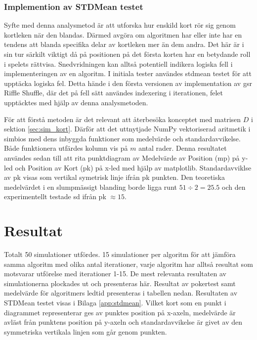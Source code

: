 \documentclass[swedish,a4paper]{article}
\begin{document}
\subsubsection{Implemention av STDMean testet}
Syfte med denna analysmetod är att utforska hur enskild kort rör sig genom
kortleken när den blandas. Därmed avgöra om algoritmen har eller inte har en
tendens att blanda specifika delar av kortleken mer än dem andra. Det här är i sin
tur särkilt viktigt då på positionen på det första korten har en betydande roll i spelets rättvisa. Snedvridningen kan alltså
potentiell indikera logiska fell i implementeringen av en algoritm. I initiala
tester användes \gls{stdmean} testet för att upptäcka logiska fel. Detta hände i
den första versionen av implementation av \gls{gsr} Riffle Shuffle, där det på
fell sätt användes indexering i iterationen, felet upptäcktes med hjälp av denna
analysmetoden. 

För att förstå metoden är det relevant att återbesöka konceptet med matrisen $D$
i sektion \ref{sec:sim_kort}. Därför att det uttnytjade NumPy vektoriserad
aritmetik i simbios med dens inbyggda funktioner som medelvärde och
standardavvikelse. Både funktionera utfärdes kolumn vis på $m$ antal rader.
Denna resultatet användes sedan till att rita punktdiagram av Medelvärde av
Position (\gls{mp}) på y-led  och Position av Kort (\gls{pk}) på x-led med hjälp
av matplotlib. Standardavviklse av \gls{pk} visas som vertikal symetrisk linje
ifrån \gls{pk} punkten. Den teoretiska medelvärdet i en slumpmässigt blanding
borde ligga runt $51 \div 2 = 25.5$ och den experimentellt testade \gls{sd}
ifrån \gls{pk} $\approx 15$.

\section{Resultat}


Totalt 50 simulationer utfördes. 15 simulationer per algoritm för att jämföra
samma algoritm med olika antal iterationer, varje algoritm har alltså resultat
som motsvarar utförelse med iterationer 1-15. De mest relevanta resultaten av
simulationerna plockades ut och presenteras här. Resultat av pokertest samt
medelvärde för algoritmers ledtid presenteras i tabellen nedan. Resultaten
av STDMean testet visas i Bilaga \ref{app:stdmean}. Vilket kort som en punkt i
diagrammet representerar ges av punktes position på x-axeln, medelvärde är
avläst från punktens position på y-axeln och standardavvikelse är givet av den
symmetriska vertikala linjen som går genom punkten.
\end{document}
